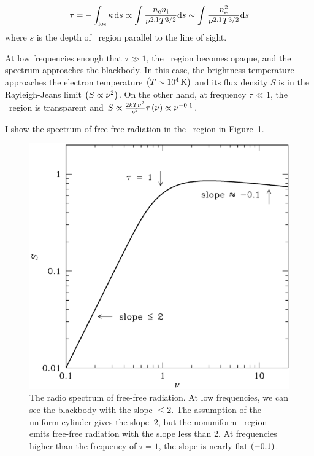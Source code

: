 \begin{equation}\label{eq:essential_radio4n53}
\tau=-\int_{\mathrm{los}} \kappa\,\mathrm{d} s \propto \int \frac{n_{\mathrm{e}} n_{\mathrm{i}}}{\nu^{2.1} T^{3/2}} \mathrm{d} s \sim \int \frac{n_{\mathrm{e}}^2}{\nu^{2.1} T^{3/2}} \mathrm{d} s
\end{equation}
where $s$ is the depth of \ih~region parallel to the line of sight.

At low frequencies enough that $\tau \gg 1$, the \ih~region becomes opaque, and the spectrum approaches the blackbody.
In this case, the brightness temperature approaches the electron temperature $\left(T\sim10^4\,\mathrm{K}\right)$ and its flux density $S$ is in the Rayleigh-Jeans limit $\left(S \propto \nu^2\right)$.
On the other hand, at frequency $\tau \ll 1$, the \ih~region is transparent and $S \propto \frac{2kT\nu^2}{c^2}\tau\left(\nu\right) \propto \nu^{-0.1}$.

I show the spectrum of free-free radiation in the \ih~region in Figure~\ref{fig:nrao_radio4n8}.

\begin{figure}[htbp]
	\centering
	\includegraphics[width=.8\linewidth]{Chapter_2/Figures/NRAO_radio4n8.png}
    \caption[The spectrum of free-free radiation]{\label{fig:nrao_radio4n8}
        The radio spectrum of free-free radiation.
        At low frequencies, we can see the blackbody with the slope $\leq 2$.
        The assumption of the uniform cylinder gives the slope $~2$, but the nonuniform \ih~region emits free-free radiation with the slope less than 2.
        At frequencies higher than the frequency of $\tau=1$, the slope is nearly flat $\left(-0.1\right)$.
    }
\end{figure}

